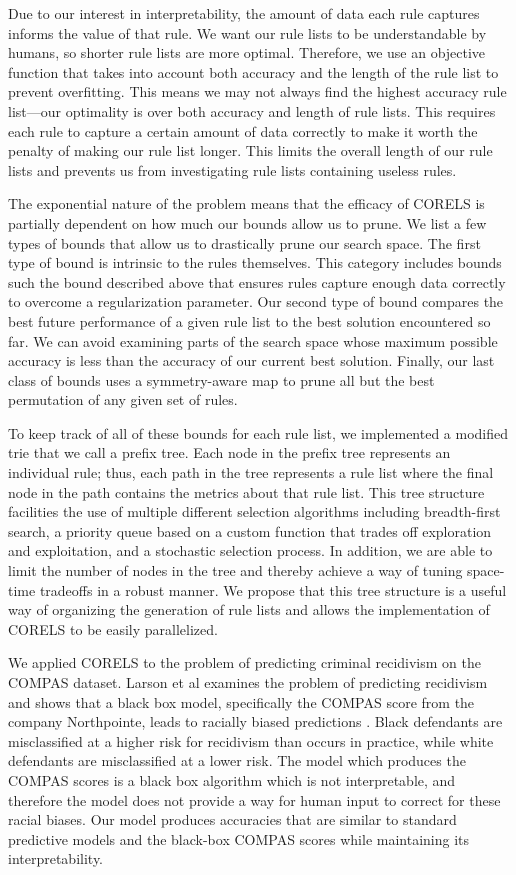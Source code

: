 Due to our interest in interpretability, the amount of data each rule captures informs the value of that rule. 
We want our rule lists to be understandable by humans, so shorter rule lists are more optimal. 
Therefore, we use an objective function that takes into account both accuracy and the length of the rule list to prevent overfitting. 
This means we may not always find the highest accuracy rule list---our optimality is over both accuracy and length of rule lists.
This requires each rule to capture a certain amount of data correctly to make it worth the penalty of making our rule list longer. 
This limits the overall length of our rule lists and prevents us from investigating rule lists containing useless rules.

The exponential nature of the problem means that the efficacy of CORELS is partially dependent on how much our bounds allow us to prune. 
We list a few types of bounds that allow us to drastically prune our search space. 
The first type of bound is intrinsic to the rules themselves.
This category includes bounds such the bound described above that ensures rules capture enough data correctly to overcome a regularization parameter. 
Our second type of bound compares the best future performance of a given rule list to the best solution encountered so far. 
We can avoid examining parts of the search space whose maximum possible accuracy is less than the accuracy of our current best solution. 
Finally, our last class of bounds uses a symmetry-aware map to prune all but the best permutation of any given set of rules.

To keep track of all of these bounds for each rule list, we implemented a modified trie that we call a prefix tree. 
Each node in the prefix tree represents an individual rule; thus, each path in the tree represents a rule list where the final node in the path contains the metrics about that rule list.
This tree structure facilities the use of multiple different selection algorithms including breadth-first search, a priority queue based on a custom function that trades off exploration and exploitation, and a stochastic selection process. 
In addition, we are able to limit the number of nodes in the tree and thereby achieve a way of tuning space-time tradeoffs in a robust manner. 
We propose that this tree structure is a useful way of organizing the generation of rule lists and allows the implementation of CORELS to be easily parallelized.

We applied CORELS to the problem of predicting criminal recidivism on the COMPAS dataset.
Larson et al examines the problem of predicting recidivism and shows that a black box model, specifically the COMPAS score from the company Northpointe, leads to racially biased predictions \cite{LarsonMaKiAn16}.
Black defendants are misclassified at a higher risk for recidivism than occurs in practice, while white defendants are misclassified at a lower risk. 
The model which produces the COMPAS scores is a black box algorithm which is not interpretable, and therefore the model does not provide a way for human input to correct for these racial biases. 
Our model produces accuracies that are similar to standard predictive models and the black-box COMPAS scores while maintaining its interpretability.

